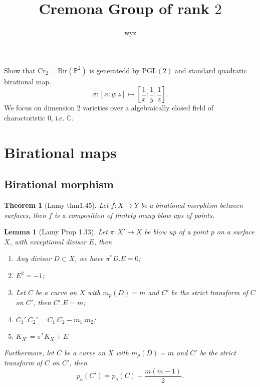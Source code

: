 \documentclass{article}
\title{Cremona Group of rank $ 2 $}
\author{wyz}
\newtheorem{lem}[defn]{Lemma}
\newtheorem{thm}[defn]{Theorem}
\begin{document}
  \maketitle
  
Show that $ \mathrm{Cr}_2=\mathrm{Bir}(\mathbb{P}^2) $ is generatedd by $ \mathrm{PGL}(2) $ and standard quadratic birational map. 
\[ \sigma:[x:y:z]\mapsto [\frac{1}{x}:\frac{1}{y}:\frac{1}{z}]. \]
We focus on dimension 2 varieties over a algebraically closed field of charactoristic $ 0 $, i.e. $ \mathbb{C} $.
\section{Birational maps}
\subsection{Birational morphism}


\begin{thm}[Lamy thm1.45]
  Let $ f:X\to Y $ be a birational morphism between surfaces, then $ f $ is a composition of finitely many blow ups of points.
\end{thm}


\begin{lem}[Lamy Prop 1.33]
  Let $ \pi:X'\to X $ be blow up of a point $ p $ on a surface $ X $, with exceptional divisor $ E $, then
  \begin{enumerate}
    \item Any divisor $ D\subset X $, we have $ \pi^*D.E=0 $;
    \item $ E^2=-1 $;
    \item Let $ C $ be a curve on $ X $ with $ m_p(D)=m $ and $ C' $ be the strict transform of $ C $ on $ C' $, then $ C'.E=m $;
    \item $ C_1'.C_2'=C_1.C_2-m_1.m_2 $;
    \item $ K_{X'}=\pi^*K_X+E $
  \end{enumerate}
Furthermore, let $ C $ be a curve on $ X $ with $ m_p(D)=m $ and $ C' $ be the strict transform of $ C $ on $ C' $, then 
\[ p_a(C')=p_a(C)-\frac{m(m-1)}{2}. \]
\end{lem}
\end{document}
